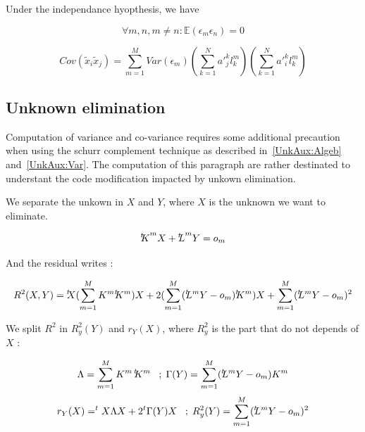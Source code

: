 Under the independance hyopthesis, we have


\begin{equation} 
  \forall m,n ,  m\neq n : \mathbb{E} ({\epsilon}_m {\epsilon}_n) = 0 
\end{equation}


\begin{equation}
     Cov(\tilde x_i \tilde x_j)  =     \sum\limits_{m=1}^M  Var({\epsilon}_m) 
                         (\sum\limits_{k=1}^N  {a'}^k_j   {l^m_k}  )
                         (\sum\limits_{k=1}^N  {a'}^k_i   {l^m_k}  )
\end{equation}



\subsection{Unknown elimination}

Computation of variance and co-variance  requires some additional precaution when using
the schurr complement technique as  described in~\ref{UnkAux:Algeb} and~\ref{UnkAux:Var}.
The computation of this paragraph are rather destinated to understant the code modification
impacted by unkown elimination.


We separate the unkown in $X$ and $Y$, where $X$ is the unknown we want to eliminate.

\begin{equation}
     {\ensuremath {^{t} \!\!}K} ^m X +  {^{t} \!\! L} ^m Y  = o_m 
\end{equation}

And the residual  writes : 

\begin{equation}
      R^2 (X,Y) =  \transX (\sum\limits_{m=1}^M  K^m {\transKm} ) X    
                  + 2 (\sum\limits_{m=1}^M  (\transLm Y - o_m  )  \transKm ) X
                  +   \sum\limits_{m=1}^M  (\transLm Y - o_m  ) ^2
\end{equation}

We split $R^2$  in $R^2_y(Y)$ and $r_Y(X)$, where  $R^2_y$ is the part that do not depends of $X$   : 

\begin{equation}
       \Lambda = \sum\limits_{m=1}^M   K^m \, ^{t} \!\! K^m                       \;\;\;  ; \;
       \Gamma(Y)  = \sum\limits_{m=1}^M  (^{t} \!\! L^m Y - o_m  ) K^m 
\end{equation}
\begin{equation}
       r_Y (X) =  ^tX  \Lambda  X    + 2   ^t \Gamma(Y)  X   \;\;\;  ; \;
       R_y^2 (Y) =  \sum\limits_{m=1}^M  (^{t} \!\! L^m Y - o_m  ) ^2 
\end{equation}

